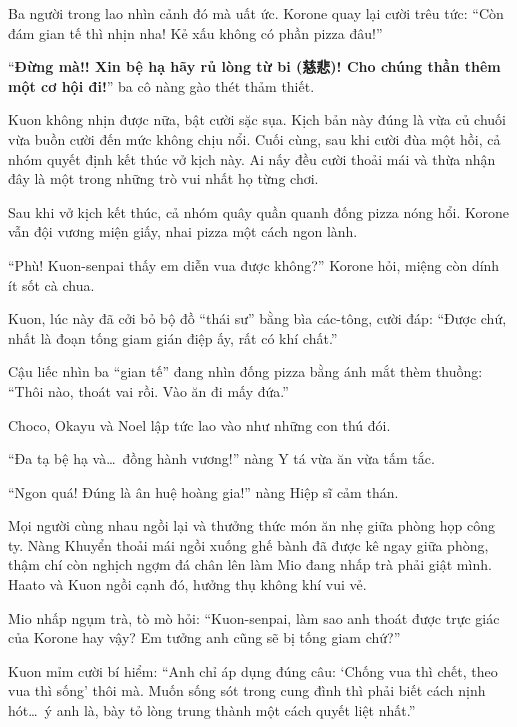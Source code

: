 \documentclass[../main.tex]{subfiles}
\begin{document}

Ba người trong lao nhìn cảnh đó mà uất ức. Korone quay lại cười trêu tức: ``Còn đám gian tế thì nhịn nha! Kẻ xấu không có phần pizza đâu!''

``\textbf{Đừng mà!! Xin bệ hạ hãy rủ lòng từ bi (慈悲)! Cho chúng thần thêm một cơ hội đi!}'' ba cô nàng gào thét thảm thiết.


Kuon không nhịn được nữa, bật cười sặc sụa. Kịch bản này đúng là vừa củ chuối vừa buồn cười đến mức không chịu nổi. Cuối cùng, sau khi cười đùa một hồi, cả nhóm quyết định kết thúc vở kịch này. Ai nấy đều cười thoải mái và thừa nhận đây là một trong những trò vui nhất họ từng chơi.

\omk

Sau khi vở kịch kết thúc, cả nhóm quây quần quanh đống pizza nóng hổi. Korone vẫn đội vương miện giấy, nhai pizza một cách ngon lành.

``Phù! Kuon-senpai thấy em diễn vua được không?'' Korone hỏi, miệng còn dính ít sốt cà chua.

Kuon, lúc này đã cởi bỏ bộ đồ ``thái sư'' bằng bìa các-tông, cười đáp: ``Được chứ, nhất là đoạn tống giam gián điệp ấy, rất có khí chất.''

Cậu liếc nhìn ba ``gian tế'' đang nhìn đống pizza bằng ánh mắt thèm thuồng: ``Thôi nào, thoát vai rồi. Vào ăn đi mấy đứa.''

Choco, Okayu và Noel lập tức lao vào như những con thú đói.

``Đa tạ bệ hạ và\dots\ đồng hành vương!'' nàng Y tá vừa ăn vừa tấm tắc.

``Ngon quá! Đúng là ân huệ hoàng gia!'' nàng Hiệp sĩ cảm thán.

Mọi người cùng nhau ngồi lại và thưởng thức món ăn nhẹ giữa phòng họp công ty. Nàng Khuyển thoải mái ngồi xuống ghế bành đã được kê ngay giữa phòng, thậm chí còn nghịch ngợm đá chân lên làm Mio đang nhấp trà phải giật mình. Haato và Kuon ngồi cạnh đó, hưởng thụ không khí vui vẻ.


Mio nhấp ngụm trà, tò mò hỏi: ``Kuon-senpai, làm sao anh thoát được trực giác của Korone hay vậy? Em tưởng anh cũng sẽ bị tống giam chứ?''

Kuon mỉm cười bí hiểm: ``Anh chỉ áp dụng đúng câu: `Chống vua thì chết, theo vua thì sống' thôi mà. Muốn sống sót trong cung đình thì phải biết cách nịnh hót\dots\ ý anh là, bày tỏ lòng trung thành một cách quyết liệt nhất.''
\end{document}

